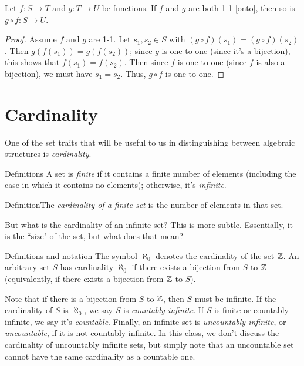 \begin{thm}\label{compbij} Let $f:S\to T$ and $g:T\to U$ be functions.
If $f$ and $g$ are both 1-1 [onto], then so is $g\circ f: S\to U$.
\end{thm}

\begin{proof}
Assume $f$ and $g$ are 1-1.  Let $s_1, s_2\in S$
with $(g\circ f)(s_1)=(g\circ f)(s_2)$.  Then $g(f(s_1))=g(f(s_2))$;
since $g$ is one-to-one (since it's a bijection), this shows that
$f(s_1)=f(s_2)$. Then since $f$ is one-to-one (since $f$ is also a
bijection), we must have $s_1=s_2$. Thus, $g\circ f$ is one-to-one.\end{proof}


\section{Cardinality}

One of the set traits that will be useful to us in
distinguishing between algebraic structures is \textit{cardinality}.

\begin{df}{Definitions} A set is \textit{finite} if it contains a finite number of
elements (including the case in which it contains no elements);
otherwise, it's \textit{infinite}.\end{df}

\begin{df}{Definition}The \textit{cardinality of a finite set} is the number of
elements in that set. \end{df}

But what is the cardinality of an infinite set?  This is more
subtle. Essentially, it is the ``size" of the set, but what
does that mean?

\begin{df}{Definitions and notation} The symbol $\aleph_0$ denotes the cardinality of the set
$\mathbb{Z}$.  An arbitrary set $S$ has cardinality $\aleph_0$ if there
exists a bijection from $S$ to $\mathbb{Z}$ (equivalently, if there
exists a bijection from $\mathbb{Z}$ to $S$).

Note that if there is a bijection from $S$ to $\mathbb{Z}$, then $S$
must be infinite.  If the cardinality of $S$ is $\aleph_0$, we
say $S$ is \textit{countably infinite}. If $S$ is finite or
countably infinite, we say it's \textit{countable}.  Finally, an
infinite set is \textit{uncountably infinite}, or \textit{uncountable}, if it is not countably infinite.  In this class,
we don't discuss the cardinality of uncountably infinite sets,
but simply note that an uncountable set cannot have the same
cardinality as a countable one.\end{df}

